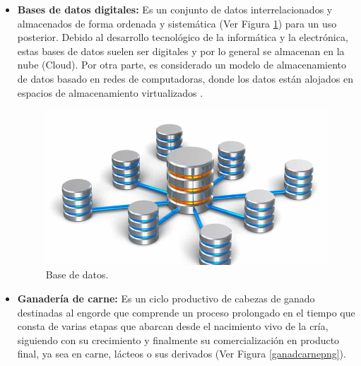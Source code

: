 \begin{itemize}
	\item \textbf{Bases de datos digitales:}
	Es un conjunto de datos interrelacionados y almacenados de forma ordenada y sistem\'atica (Ver Figura \ref{databasepng}) para un uso posterior\cite{database}. Debido al desarrollo tecnol\'ogico de la inform\'atica y la electr\'onica, estas bases de datos suelen ser digitales y por lo general se almacenan en la nube (Cloud). Por otra parte, es considerado un modelo de almacenamiento de datos basado en redes de computadoras, donde los datos est\'an alojados en espacios de almacenamiento virtualizados \cite{cloud}.
	\begin{figure}[H]
		\begin{center}
			\includegraphics[scale=0.35]{img/databasepng.png}
		\end{center}
	\caption{Base de datos. \label{databasepng}}
	\end{figure}
	
	\item \textbf{Ganadería de carne:}
	 Es un ciclo productivo de cabezas de ganado destinadas al engorde que comprende un proceso prolongado en el tiempo que consta de varias etapas que abarcan desde el nacimiento vivo de la cría, siguiendo con su crecimiento y finalmente su comercialización en producto final, ya sea en carne, lácteos o sus derivados (Ver Figura \ref{ganadcarnepng}).
	 

\end{itemize}
